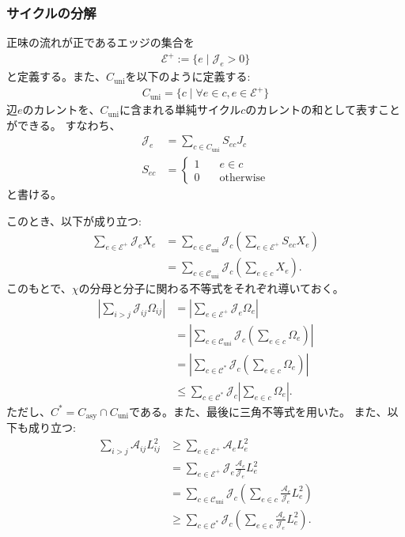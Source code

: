 \documentclass[a4paper,11pt]{jsarticle}
\numberwithin{equation}{section}
\begin{document}
\subsubsection{サイクルの分解}
正味の流れが正であるエッジの集合を
\begin{align}
    \mathcal{E}^{+} := \{ e \mid \mathcal{J}_e > 0 \}
\end{align}
と定義する。また、$C_{\text{uni}}$を以下のように定義する:
\begin{align}
    C_{\text{uni}} = \{ c  \mid \forall e \in c, e \in \mathcal{E}^{+} \}
\end{align}
辺$e$のカレントを、$C_{\text{uni}}$に含まれる単純サイクル$c$のカレントの和として表すことができる。
すなわち、
\begin{align}
    \mathcal{J}_{e} &= \sum_{c \in C_{\text{uni}}}S_{ec} J_c \\ 
    S_{ec} &=
    \begin{cases}
        1 & \quad e \in c \\
        0 & \quad \text{otherwise}
    \end{cases}
\end{align}
と書ける。

このとき、以下が成り立つ:
\begin{align}
\sum_{e \in \mathcal{E}^+} \mathcal{J}_e X_e
&= \sum_{c \in \mathcal{C}_{\mathrm{uni}}} \mathcal{J}_c \left( \sum_{e \in \mathcal{E}^+} S_{ec} X_e \right) \\
&= \sum_{c \in \mathcal{C}_{\mathrm{uni}}} \mathcal{J}_c \left( \sum_{e \in c} X_e \right).
\end{align}
このもとで、$\chi$の分母と分子に関わる不等式をそれぞれ導いておく。
\begin{align}
\left| \sum_{i>j} \mathcal{J}_{ij} \Omega_{ij} \right|
&= \left| \sum_{e \in \mathcal{E}^+} \mathcal{J}_e \Omega_e \right| \\
&= \left| \sum_{c \in \mathcal{C}_{\mathrm{uni}}} \mathcal{J}_c \left( \sum_{e \in c} \Omega_e \right) \right| \\
&= \left| \sum_{c \in \mathcal{C}^*} \mathcal{J}_c \left( \sum_{e \in c} \Omega_e \right) \right| \\
&\leq \sum_{c \in \mathcal{C}^*} \mathcal{J}_c \left| \sum_{e \in c} \Omega_e \right|.
\end{align}
ただし、$C^* = C_{\text{asy}} \cap C_{\text{uni}}$である。また、最後に三角不等式を用いた。
また、以下も成り立つ:
\begin{align}
\sum_{i>j} \mathcal{A}_{ij} L_{ij}^2
&\geq \sum_{e \in \mathcal{E}^+} \mathcal{A}_e L_e^2 \\
&= \sum_{e \in \mathcal{E}^+} \mathcal{J}_e \frac{\mathcal{A}_e}{\mathcal{J}_e} L_e^2 \\
&= \sum_{c \in \mathcal{C}_{\mathrm{uni}}} \mathcal{J}_c \left( \sum_{e \in c} \frac{\mathcal{A}_e}{\mathcal{J}_e} L_e^2 \right) \\
&\geq \sum_{c \in \mathcal{C}^*} \mathcal{J}_c \left( \sum_{e \in c} \frac{\mathcal{A}_e}{\mathcal{J}_e} L_e^2 \right).
\end{align}
\end{document}
